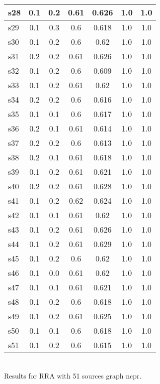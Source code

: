 \documentclass{article}
\begin{document}
\begin{tabular}{|l|c|c|c|c|c|c|}
\hline
s28 &0.1 & 0.2 & 0.61 & 0.626 & 1.0 & 1.0\\
\hline
s29 &0.1 & 0.3 & 0.6 & 0.618 & 1.0 & 1.0\\
\hline
s30 &0.1 & 0.2 & 0.6 & 0.62 & 1.0 & 1.0\\
\hline
s31 &0.2 & 0.2 & 0.61 & 0.626 & 1.0 & 1.0\\
\hline
s32 &0.1 & 0.2 & 0.6 & 0.609 & 1.0 & 1.0\\
\hline
s33 &0.1 & 0.2 & 0.61 & 0.62 & 1.0 & 1.0\\
\hline
s34 &0.2 & 0.2 & 0.6 & 0.616 & 1.0 & 1.0\\
\hline
s35 &0.1 & 0.1 & 0.6 & 0.617 & 1.0 & 1.0\\
\hline
s36 &0.2 & 0.1 & 0.61 & 0.614 & 1.0 & 1.0\\
\hline
s37 &0.2 & 0.2 & 0.6 & 0.613 & 1.0 & 1.0\\
\hline
s38 &0.2 & 0.1 & 0.61 & 0.618 & 1.0 & 1.0\\
\hline
s39 &0.1 & 0.2 & 0.61 & 0.621 & 1.0 & 1.0\\
\hline
s40 &0.2 & 0.2 & 0.61 & 0.628 & 1.0 & 1.0\\
\hline
s41 &0.1 & 0.2 & 0.62 & 0.624 & 1.0 & 1.0\\
\hline
s42 &0.1 & 0.1 & 0.61 & 0.62 & 1.0 & 1.0\\
\hline
s43 &0.1 & 0.2 & 0.61 & 0.626 & 1.0 & 1.0\\
\hline
s44 &0.1 & 0.2 & 0.61 & 0.629 & 1.0 & 1.0\\
\hline
s45 &0.1 & 0.2 & 0.6 & 0.62 & 1.0 & 1.0\\
\hline
s46 &0.1 & 0.0 & 0.61 & 0.62 & 1.0 & 1.0\\
\hline
s47 &0.1 & 0.1 & 0.61 & 0.621 & 1.0 & 1.0\\
\hline
s48 &0.1 & 0.2 & 0.6 & 0.618 & 1.0 & 1.0\\
\hline
s49 &0.1 & 0.2 & 0.61 & 0.625 & 1.0 & 1.0\\
\hline
s50 &0.1 & 0.1 & 0.6 & 0.618 & 1.0 & 1.0\\
\hline
s51 &0.1 & 0.2 & 0.6 & 0.615 & 1.0 & 1.0\\
\hline
\end{tabular}\\

\noindent Results for RRA with 51 sources graph ncpr.
\end{document}
